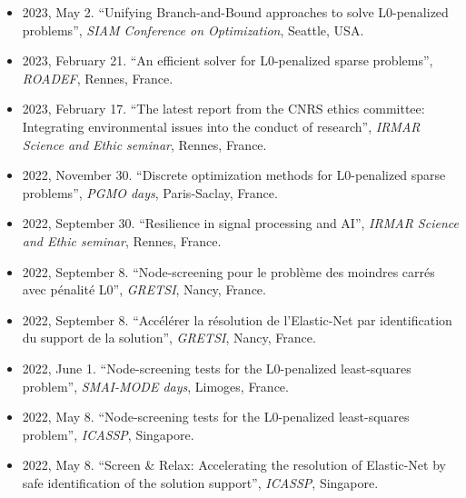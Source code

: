\begin{itemize}
    \item 2023, May 2. ``Unifying Branch-and-Bound approaches to solve L0-penalized problems'', \textit{SIAM Conference on Optimization}, Seattle, USA.
    \item 2023, February 21. ``An efficient solver for L0-penalized sparse problems'', \textit{ROADEF}, Rennes, France.
    \item 2023, February 17. ``The latest report from the CNRS ethics committee: Integrating environmental issues into the conduct of research'', \textit{IRMAR Science and Ethic seminar}, Rennes, France.
    \item 2022, November 30. ``Discrete optimization methods for L0-penalized sparse problems'', \textit{PGMO days}, Paris-Saclay, France.
    \item 2022, September 30. ``Resilience in signal processing and AI'', \textit{IRMAR Science and Ethic seminar}, Rennes, France.
    \item 2022, September 8. ``Node-screening pour le problème des moindres carrés avec pénalité L0'', \textit{GRETSI}, Nancy, France.
    \item 2022, September 8. ``Accélérer la résolution de l’Elastic-Net par identification du support de la solution'', \textit{GRETSI}, Nancy, France.
    \item 2022, June 1. ``Node-screening tests for the L0-penalized least-squares problem'', \textit{SMAI-MODE days}, Limoges, France.
    \item 2022, May 8. ``Node-screening tests for the L0-penalized least-squares problem'', \textit{ICASSP}, Singapore.
    \item 2022, May 8. ``Screen \& Relax: Accelerating the resolution of Elastic-Net by safe identification of the solution support'', \textit{ICASSP}, Singapore.
\end{itemize}